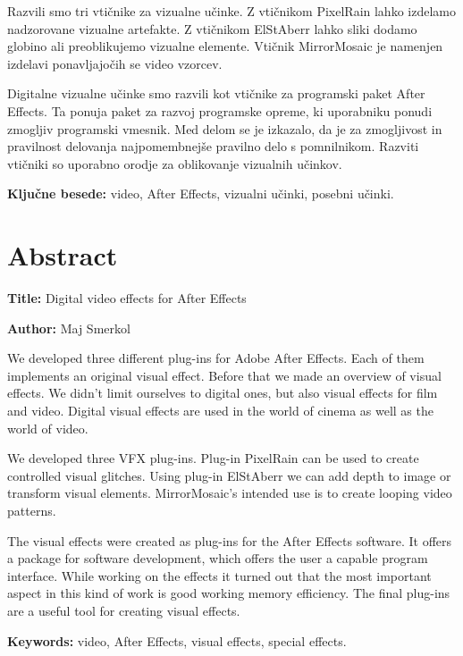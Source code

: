 \documentclass[a4paper, 12pt]{book}
\newcommand{\ttitleEn}{Digital video effects for After Effects}
\newcommand{\tauthor}{Maj Smerkol}
\newcommand{\tkeywords}{video, After Effects, vizualni učinki, posebni učinki}
\newcommand{\tkeywordsEn}{video, After Effects, visual effects, special effects}
\newcommand{\clearemptydoublepage}{\newpage{\pagestyle{empty}\cleardoublepage}}
\begin{document}
Razvili smo tri vtičnike za vizualne učinke.
Z vtičnikom PixelRain lahko izdelamo nadzorovane vizualne artefakte.
Z vtičnikom ElStAberr lahko sliki dodamo globino ali preoblikujemo vizualne elemente.
Vtičnik MirrorMosaic je namenjen izdelavi ponavljajočih se video vzorcev.

Digitalne vizualne učinke smo razvili kot vtičnike za programski paket After Effects.
Ta ponuja paket za razvoj programske opreme, ki uporabniku ponudi zmogljiv programski vmesnik.
Med delom se je izkazalo, da je za zmogljivost in pravilnost delovanja najpomembnejše pravilno delo s pomnilnikom.
Razviti vtičniki so uporabno orodje za oblikovanje vizualnih učinkov.

\bigskip

\noindent\textbf{Ključne besede:} \tkeywords.
\clearemptydoublepage

\chapter*{Abstract}

\noindent\textbf{Title:} \ttitleEn
\bigskip

\noindent\textbf{Author:} \tauthor
\bigskip

\noindent We developed three different plug-ins for Adobe After Effects. 
Each of them implements an original visual effect. 
Before that we made an overview of visual effects. 
We didn’t limit ourselves to digital ones, but also visual effects for film and video. 
Digital visual effects are used in the world of cinema as well as the world of video. 

We developed three VFX plug-ins.
Plug-in PixelRain can be used to create controlled visual glitches.
Using plug-in ElStAberr we can add depth to image or transform visual elements.
MirrorMosaic's intended use is to create looping video patterns.

The visual effects were created as plug-ins for the After Effects software. 
It offers a package for software development, which offers the user a capable program interface. 
While working on the effects it turned out that the most important aspect in this kind of work is good working memory efficiency. 
The final plug-ins are a useful tool for creating visual effects.

\bigskip

\noindent\textbf{Keywords:} \tkeywordsEn.
\clearemptydoublepage
\end{document}
